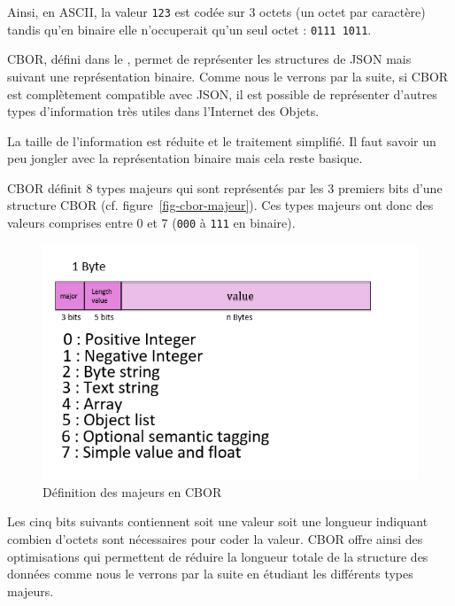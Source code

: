 Ainsi, en ASCII, la valeur \texttt{123} est codée sur 3 octets (un octet par caractère) tandis qu'en binaire elle n'occuperait qu'un seul octet : \texttt{0111 1011}. 

      \vspace{1em}

\ac{CBOR}, défini dans le , permet de représenter les structures de \ac{JSON} mais suivant une représentation binaire. Comme nous le verrons par la suite, si \ac{CBOR} est complètement compatible avec \ac{JSON}, il est possible de représenter d'autres types d'information très utiles dans l'Internet des Objets.

La taille de l'information est réduite et le traitement simplifié. Il faut savoir un peu jongler avec la représentation binaire mais cela reste basique.

      \vspace{1em}

CBOR définit 8 types majeurs qui sont représentés par les 3 premiers bits d'une structure CBOR (cf. figure~\vref{fig-cbor-majeur}). Ces types majeurs ont donc des valeurs comprises entre 0 et 7 (\texttt{000} à \texttt{111} en binaire).

\begin{figure}[tbp]
\centerline{\includegraphics[width=1\columnwidth]{Pictures/cbor1.png}}
\caption{Définition des majeurs en CBOR}
\label{fig-cbor-majeur}
\end{figure}


Les cinq bits suivants contiennent soit une valeur soit une longueur indiquant combien d'octets sont nécessaires pour coder la valeur. \ac{CBOR} offre ainsi des optimisations qui permettent de réduire la longueur totale de la structure des données comme nous le verrons par la suite en étudiant les différents types majeurs.


